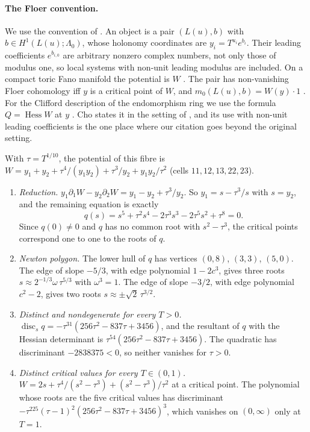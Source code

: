 \documentclass[11pt]{article}
\theoremstyle{definition}\newtheorem{definition}[theorem]{Definition}\newtheorem{remark}[theorem]{Remark}\newtheorem{example}[theorem]{Example}\newtheorem{problem}[theorem]{Open problem}\crefname{problem}{Problem}{Problems}
\begin{document}
\paragraph{The Floer convention.} We use the convention of \cite{FOOO2010}. An object is a pair $(L(u),b)$ with $b\in H^1(L(u);\Lambda_0)$, whose holonomy coordinates are $y_i=T^{u_i}e^{b_i}$. Their
leading coefficients $e^{b_{i,0}}$ are arbitrary nonzero complex numbers, not only those of modulus one, so local systems with non-unit leading modulus are included. On a compact toric
Fano manifold the potential is $W$ \cite{ChoOh2006}. The pair has non-vanishing Floer cohomology iff $y$ is a critical point of $W$, and $m_0(L(u),b)=W(y)\cdot1$ \cite{FOOO2010}. For the Clifford
description of the endomorphism ring we use the formula $Q=\operatorname{Hess}W$ at $y$ \cite[Thm.~5.6]{Cho2005}. Cho states it in the setting of \cite{ChoOh2006}, and its use with non-unit leading
coefficients is the one place where our citation goes beyond the original setting.

With $\tau=T^{1/10}$, the potential of this fibre is $W=y_1+y_2+\tau^4/(y_1y_2)+\tau^3/y_2+y_1y_2/\tau^2$ (cells $11,12,13,22,23$).

\begin{proposition}\label{prop:five}
\begin{enumerate}
\item[(1)] \emph{Reduction.} $y_1\partial_1W-y_2\partial_2W=y_1-y_2+\tau^3/y_2$. So $y_1=s-\tau^3/s$ with $s=y_2$, and the remaining equation is exactly
\[
q(s)=s^5+\tau^2s^4-2\tau^3s^3-2\tau^5s^2+\tau^8=0 .
\]
  Since $q(0)\ne0$ and $q$ has no common root with $s^2-\tau^3$, the critical points correspond one to one to the roots of $q$.
\item[(2)] \emph{Newton polygon.} The lower hull of $q$ has vertices $(0,8)$, $(3,3)$, $(5,0)$. The edge of slope $-5/3$, with edge polynomial $1-2c^3$, gives three roots $s\approx2^{-1/3}\omega\,\tau^{5/3}$ with $\omega^3=1$. The
  edge of slope $-3/2$, with edge polynomial $c^2-2$, gives two roots $s\approx\pm\sqrt2\,\tau^{3/2}$.
\item[(3)] \emph{Distinct and nondegenerate for every $T>0$.} $\operatorname{disc}_sq=-\tau^{31}(256\tau^2-837\tau+3456)$, and the resultant of $q$ with the Hessian determinant is $\tau^{54}(256\tau^2-837\tau+3456)$. The quadratic has
  discriminant $-2838375<0$, so neither vanishes for $\tau>0$.
\item[(4)] \emph{Distinct critical values for every $T\in(0,1)$.} $W=2s+\tau^4/(s^2-\tau^3)+(s^2-\tau^3)/\tau^2$ at a critical point. The polynomial whose roots are the five critical values has discriminant
  $-\tau^{225}(\tau-1)^2(256\tau^2-837\tau+3456)^3$, which vanishes on $(0,\infty)$ only at $T=1$.
\end{enumerate}
\end{proposition}
\end{document}
